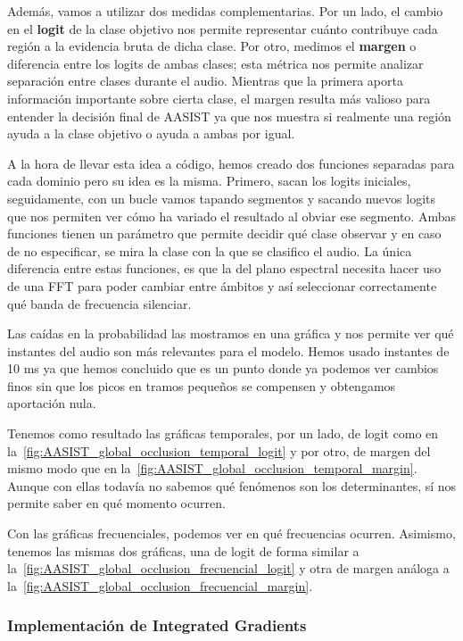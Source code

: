 Además, vamos a utilizar dos medidas complementarias. Por un lado, el cambio en el \textbf{logit} de la clase objetivo nos permite representar cuánto contribuye cada región a la evidencia bruta de dicha clase. Por otro, medimos el \textbf{margen} o diferencia entre los logits de ambas clases; esta métrica nos permite analizar separación entre clases durante el audio. Mientras que la primera aporta información importante sobre cierta clase, el margen resulta más valioso para entender la decisión final de AASIST ya que nos muestra si realmente una región ayuda a la clase objetivo o ayuda a ambas por igual.

A la hora de llevar esta idea a código, hemos creado dos funciones separadas para cada dominio pero su idea es la misma. Primero, sacan los logits iniciales, seguidamente, con un bucle vamos tapando segmentos y sacando nuevos logits que nos permiten ver cómo ha variado el resultado al obviar ese segmento. Ambas funciones tienen un parámetro que permite decidir qué clase observar y en caso de no especificar, se mira la clase con la que se clasifico el audio.
La única diferencia entre estas funciones, es que la del plano espectral necesita hacer uso de una FFT para poder cambiar entre ámbitos y así seleccionar correctamente qué banda de frecuencia silenciar.

Las caídas en la probabilidad las mostramos en una gráfica y nos permite ver qué instantes del audio son más relevantes para el modelo.
Hemos usado instantes de 10 ms ya que hemos concluido que es un punto donde ya podemos ver cambios finos sin que los picos en tramos pequeños se compensen y obtengamos aportación nula.

Tenemos como resultado las gráficas temporales, por un lado, de logit como en la~\autoref{fig:AASIST_global_occlusion_temporal_logit} y por otro, de margen del mismo modo que en la~\autoref{fig:AASIST_global_occlusion_temporal_margin}. Aunque con ellas todavía no sabemos qué fenómenos son los determinantes, sí nos permite saber en qué momento ocurren.

Con las gráficas frecuenciales, podemos ver en qué frecuencias ocurren. Asimismo, tenemos las mismas dos gráficas, una de logit de forma similar a la~\autoref{fig:AASIST_global_occlusion_frecuencial_logit} y otra de margen análoga a la~\autoref{fig:AASIST_global_occlusion_frecuencial_margin}.

\subsubsection*{Implementación de Integrated Gradients}

